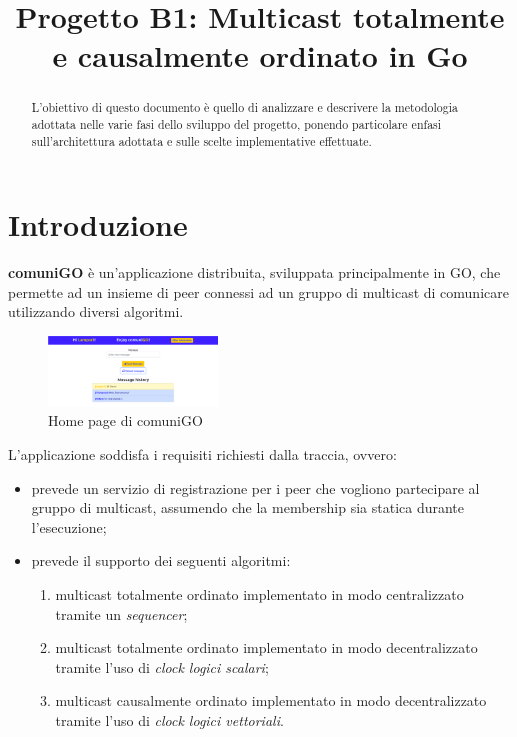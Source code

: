 \documentclass[conference]{IEEEtran}
\begin{document}
\title{Progetto B1: Multicast totalmente e causalmente ordinato in Go}

\author{
}


\maketitle

\begin{abstract}
L'obiettivo di questo documento è quello di analizzare e descrivere la metodologia adottata nelle varie fasi dello sviluppo del progetto, ponendo particolare enfasi sull'architettura adottata e sulle scelte implementative effettuate. 
\end{abstract}

\section{Introduzione}
\textbf{comuniGO} è un'applicazione distribuita, sviluppata principalmente in GO, che permette ad un insieme di peer connessi ad un gruppo di multicast di comunicare utilizzando diversi algoritmi.

\begin{figure}[htbp]
\centerline{\includegraphics[width=0.4\textwidth]{figs/home.png}}
\caption{Home page di comuniGO}
\label{fig:home}
\end{figure}

L'applicazione soddisfa i requisiti richiesti dalla traccia, ovvero:
\begin{itemize}
\item prevede un servizio di registrazione per i peer che vogliono partecipare al gruppo di multicast, assumendo che la membership sia statica durante l'esecuzione;

\item prevede il supporto dei seguenti algoritmi:
\begin{enumerate}
\item multicast totalmente ordinato implementato in modo centralizzato tramite un \textsl{sequencer};

\item multicast totalmente ordinato implementato in modo decentralizzato tramite l'uso di \textsl{clock logici scalari};

\item multicast causalmente ordinato implementato in modo decentralizzato tramite l'uso di \textsl{clock logici vettoriali}.
\end{enumerate}
\end{itemize}
\end{document}
